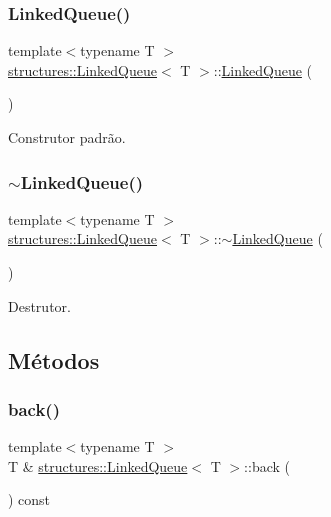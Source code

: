 \subsubsection{\texorpdfstring{Linked\+Queue()}{LinkedQueue()}}
{\footnotesize\ttfamily template$<$typename T $>$ \\
\hyperlink{classstructures_1_1LinkedQueue}{structures\+::\+Linked\+Queue}$<$ T $>$\+::\hyperlink{classstructures_1_1LinkedQueue}{Linked\+Queue} (\begin{DoxyParamCaption}{ }\end{DoxyParamCaption})}



Construtor padrão. 

\mbox{\label{classstructures_1_1LinkedQueue_ad3f70a9465ecbf8868ad9206e2b01711}} 
\subsubsection{\texorpdfstring{$\sim$\+Linked\+Queue()}{~LinkedQueue()}}
{\footnotesize\ttfamily template$<$typename T $>$ \\
\hyperlink{classstructures_1_1LinkedQueue}{structures\+::\+Linked\+Queue}$<$ T $>$\+::$\sim$\hyperlink{classstructures_1_1LinkedQueue}{Linked\+Queue} (\begin{DoxyParamCaption}{ }\end{DoxyParamCaption})}



Destrutor. 



\subsection{Métodos}
\mbox{\label{classstructures_1_1LinkedQueue_ac69ee50f58e8501f7eaddec5b474a87c}} 
\subsubsection{\texorpdfstring{back()}{back()}}
{\footnotesize\ttfamily template$<$typename T $>$ \\
T \& \hyperlink{classstructures_1_1LinkedQueue}{structures\+::\+Linked\+Queue}$<$ T $>$\+::back (\begin{DoxyParamCaption}{ }\end{DoxyParamCaption}) const}



